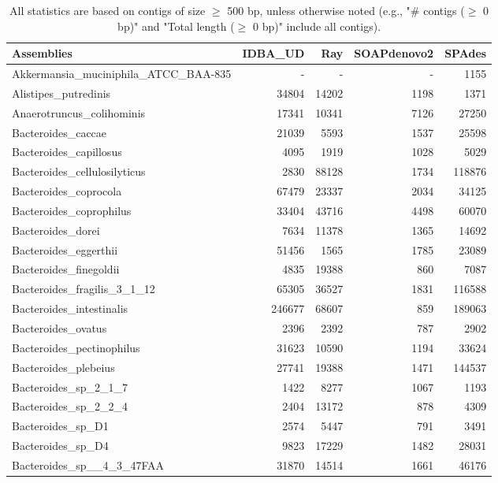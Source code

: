 \documentclass[12pt,a4paper]{article}
\begin{document}
\begin{table}[ht]
\begin{center}
\caption{All statistics are based on contigs of size $\geq$ 500 bp, unless otherwise noted (e.g., "\# contigs ($\geq$ 0 bp)" and "Total length ($\geq$ 0 bp)" include all contigs).}
\begin{tabular}{|l*{4}{|r}|}
\hline
Assemblies & IDBA\_UD & Ray & SOAPdenovo2 & SPAdes \\ \hline
Akkermansia\_muciniphila\_ATCC\_BAA-835 & - & - & - & 1155 \\ \hline
Alistipes\_putredinis & 34804 & 14202 & 1198 & 1371 \\ \hline
Anaerotruncus\_colihominis & 17341 & 10341 & 7126 & 27250 \\ \hline
Bacteroides\_caccae & 21039 & 5593 & 1537 & 25598 \\ \hline
Bacteroides\_capillosus & 4095 & 1919 & 1028 & 5029 \\ \hline
Bacteroides\_cellulosilyticus & 2830 & 88128 & 1734 & 118876 \\ \hline
Bacteroides\_coprocola & 67479 & 23337 & 2034 & 34125 \\ \hline
Bacteroides\_coprophilus & 33404 & 43716 & 4498 & 60070 \\ \hline
Bacteroides\_dorei & 7634 & 11378 & 1365 & 14692 \\ \hline
Bacteroides\_eggerthii & 51456 & 1565 & 1785 & 23089 \\ \hline
Bacteroides\_finegoldii & 4835 & 19388 & 860 & 7087 \\ \hline
Bacteroides\_fragilis\_3\_1\_12 & 65305 & 36527 & 1831 & 116588 \\ \hline
Bacteroides\_intestinalis & 246677 & 68607 & 859 & 189063 \\ \hline
Bacteroides\_ovatus & 2396 & 2392 & 787 & 2902 \\ \hline
Bacteroides\_pectinophilus & 31623 & 10590 & 1194 & 33624 \\ \hline
Bacteroides\_plebeius & 27741 & 19388 & 1471 & 144537 \\ \hline
Bacteroides\_sp\_2\_1\_7 & 1422 & 8277 & 1067 & 1193 \\ \hline
Bacteroides\_sp\_2\_2\_4 & 2404 & 13172 & 878 & 4309 \\ \hline
Bacteroides\_sp\_D1 & 2574 & 5447 & 791 & 3491 \\ \hline
Bacteroides\_sp\_D4 & 9823 & 17229 & 1482 & 28031 \\ \hline
Bacteroides\_sp\_\_4\_3\_47FAA & 31870 & 14514 & 1661 & 46176 \\ \hline

\end{tabular}
\end{center}
\end{table}
\end{document}
